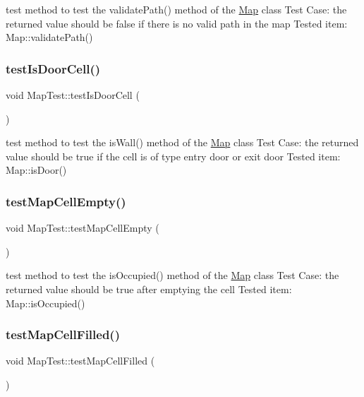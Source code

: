 test method to test the validate\+Path() method of the \hyperlink{classMap}{Map} class Test Case\+: the returned value should be false if there is no valid path in the map Tested item\+: Map\+::validate\+Path() \hypertarget{classMapTest_a87e123f3f250492e1c444f0a3c8338b5}{}\label{classMapTest_a87e123f3f250492e1c444f0a3c8338b5} 
\subsubsection{\texorpdfstring{test\+Is\+Door\+Cell()}{testIsDoorCell()}}
{\footnotesize\ttfamily void Map\+Test\+::test\+Is\+Door\+Cell (\begin{DoxyParamCaption}{ }\end{DoxyParamCaption})\hspace{0.3cm}{\ttfamily [protected]}}

test method to test the is\+Wall() method of the \hyperlink{classMap}{Map} class Test Case\+: the returned value should be true if the cell is of type entry door or exit door Tested item\+: Map\+::is\+Door() \hypertarget{classMapTest_a83bb3473f74089996c7f6bee8d59a97c}{}\label{classMapTest_a83bb3473f74089996c7f6bee8d59a97c} 
\subsubsection{\texorpdfstring{test\+Map\+Cell\+Empty()}{testMapCellEmpty()}}
{\footnotesize\ttfamily void Map\+Test\+::test\+Map\+Cell\+Empty (\begin{DoxyParamCaption}{ }\end{DoxyParamCaption})\hspace{0.3cm}{\ttfamily [protected]}}

test method to test the is\+Occupied() method of the \hyperlink{classMap}{Map} class Test Case\+: the returned value should be true after emptying the cell Tested item\+: Map\+::is\+Occupied() \hypertarget{classMapTest_a07e1aa96435351d15809b880ff7a7efb}{}\label{classMapTest_a07e1aa96435351d15809b880ff7a7efb} 
\subsubsection{\texorpdfstring{test\+Map\+Cell\+Filled()}{testMapCellFilled()}}
{\footnotesize\ttfamily void Map\+Test\+::test\+Map\+Cell\+Filled (\begin{DoxyParamCaption}{ }\end{DoxyParamCaption})\hspace{0.3cm}{\ttfamily [protected]}}

